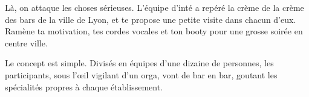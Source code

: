 Là, on attaque les choses sérieuses. L'équipe d'inté a repéré la crème de la
crème des bars de la ville de Lyon, et te propose une petite visite dans chacun
d'eux. Ramène ta motivation, tes cordes vocales et ton booty pour une grosse
soirée en centre ville.

Le concept est simple. Divisés en équipes d'une dizaine de personnes, les
participants, sous l'œil vigilant d'un orga, vont de bar en bar, goutant les
spécialités propres à chaque établissement.
